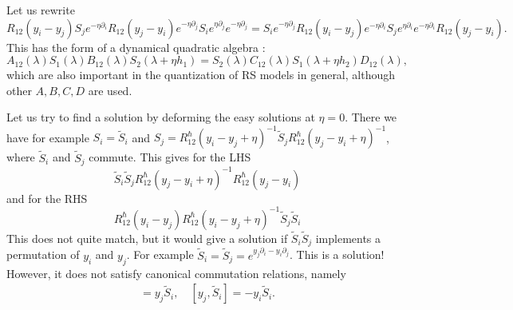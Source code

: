 \documentclass[11pt]{report}
\theoremstyle{definition}
\theoremstyle{remark}
\theoremstyle{remark}
\begin{document}
Let us rewrite
\begin{equation*}
R_{12}(y_i-y_j) S_j e^{-\eta \partial_i} R_{12}(y_j-y_i) e^{-\eta \partial_j} S_i e^{\eta \partial_j} e^{-\eta \partial_j} = S_i e^{-\eta \partial_j} R_{12}(y_i-y_j) e^{-\eta \partial_i} S_j e^{\eta \partial_i} e^{-\eta \partial_i} R_{12}(y_j-y_i).
\end{equation*}
This has the form of a dynamical quadratic algebra \cite{article:nagy:2004}:
\begin{equation*}
A_{12}(\lambda) S_1(\lambda) B_{12}(\lambda) S_2(\lambda+\eta h_1) = S_2(\lambda) C_{12}(\lambda) S_1(\lambda+\eta h_2) D_{12}(\lambda),
\end{equation*}
which are also important in the quantization of RS models in general, although other $A,B,C,D$ are used.

Let us try to find a solution by deforming the easy solutions at $\eta = 0$. There we have for example $S_i = \tilde S_i$ and $S_j = R_{12}^\hbar(y_i-y_j+\eta)^{-1} \tilde S_j R_{12}^\hbar(y_j-y_i+\eta)^{-1}$, where $\tilde S_i$ and $\tilde S_j$ commute. This gives for the LHS
\begin{equation*}
\tilde S_i \tilde S_j R_{12}^\hbar(y_j-y_i+\eta)^{-1} R_{12}^\hbar(y_j-y_i)
\end{equation*}
and for the RHS
\begin{equation*}
R_{12}^\hbar(y_i-y_j) R_{12}^\hbar(y_i-y_j+\eta)^{-1} \tilde S_j \tilde S_i
\end{equation*}
This does not quite match, but it would give a solution if $\tilde S_i \tilde S_j$ implements a permutation of $y_i$ and $y_j$. For example $\tilde S_i = \tilde S_j = e^{y_j \partial_i - y_i \partial_j}$. This is a solution! However, it does not satisfy canonical commutation relations, namely
\begin{align*}
[y_i,\tilde S_i] = y_j \tilde S_i, \quad [y_j,\tilde S_i] = -y_i \tilde S_i.
\end{align*}
\end{document}
